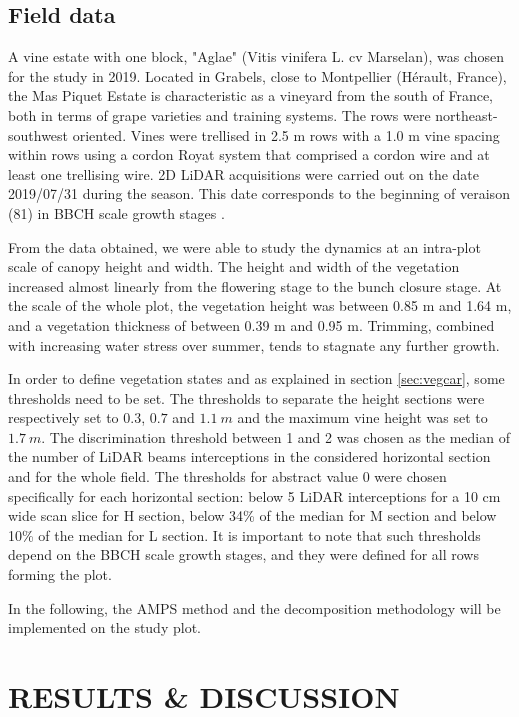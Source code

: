 \documentclass[preprint,3p,times,twocolumn]{elsarticle}
\begin{document}
\subsection{Field data}
A vine estate with one block, "Aglae" (Vitis vinifera L. cv Marselan), was chosen for the study in 2019. Located in Grabels, close to Montpellier (Hérault, France), the Mas Piquet Estate is characteristic as a vineyard from the south of France, both in terms of grape varieties and training systems. The rows were northeast-southwest oriented. Vines were trellised in 2.5 m rows with a 1.0 m vine spacing within rows using a cordon Royat system that comprised a cordon wire and at least one trellising wire. 2D LiDAR acquisitions were carried out on the date 2019/07/31 during the season. This date corresponds to the beginning of veraison (81) in BBCH scale growth stages \cite{lorenz1994phanologische}.

From the data obtained, we were able to study the dynamics at an intra-plot scale of canopy height and width. The height and width of the vegetation increased almost linearly from the flowering stage to the bunch closure stage. At the scale of the whole plot, the vegetation height was between 0.85 m and 1.64 m, and a vegetation thickness of between 0.39 m and 0.95 m. Trimming, combined with increasing water stress over summer, tends to stagnate any further growth.

In order to define vegetation states and as explained in section \ref{sec:vegcar}, some thresholds need to be set. The thresholds to separate the height sections were respectively set to $0.3$, $0.7$ and $1.1\ m $ and the maximum vine height was set to $1.7\ m $. The discrimination threshold between 1 and 2 was chosen as the median of the number of LiDAR beams
interceptions in the considered horizontal section and for the whole field. The thresholds for abstract value 0 were chosen specifically for each horizontal section: below 5 LiDAR interceptions for a 10 cm wide scan slice for H section, below 34\% of the median for M section and below 10\% of the median for L section. It is important to note that such thresholds depend on the BBCH scale growth stages, and they were defined for all rows forming the plot.   


In the following, the AMPS method and the decomposition methodology will be implemented on the study plot.


\section{RESULTS \& DISCUSSION}
\label{results}
\end{document}
